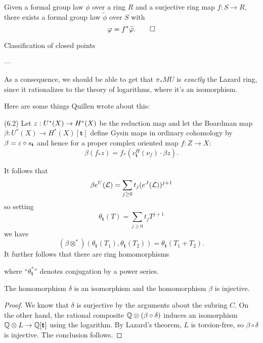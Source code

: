 \begin{corollary}
Given a formal group law $\phi$ over a ring $R$ and a surjective ring map $f: S \to R$, there exists a formal group law $\widetilde \phi$ over $S$ with \[\phi = f^* \widetilde \phi. \qed\]
\end{corollary}

Classification of closed points


---

As a consequence, we should be able to get that $\pi_* MU$ is \emph{exactly} the Lazard ring, since it rationalizes to the theory of logarithms, where it's an isomorphism.

Here are some things Quillen wrote about this:

\begin{definition}(6.2)
Let $\eps: U^*(X) \to H^*(X)$ be the reduction map and let the Boardman map $\beta: U^*(X) \to H^*(X)[\mathbf t]$ define Gysin maps in ordinary cohomology by $\beta = \eps \circ s_{\mathbf t}$ and hence for a proper complex oriented map $f: Z \to X$: \[\beta(f_* z) = f_*(c_{\mathbf t}^H(\nu_f) \cdot \beta z).\] 
\end{definition}

\begin{definition}
It follows that \[\beta e^U(\L) = \sum_{j \ge 0} t_j(e^J(\L))^{j+1}\] so setting \[\theta_{\mathbf t}(T) = \sum_{j \ge 0} t_j T^{j+1}\] we have \[(\beta \otimes^*)(\theta_{\mathbf t}(T_1), \theta_{\mathbf t}(T_2)) = \theta_{\mathbf t}(T_1 + T_2).\]  It further follows that there are ring homomorphisms
\begin{center}
\end{center}
where ``$\theta_{\mathbf t}^*$'' denotes conjugation by a power series.
\end{definition}

\begin{theorem}
The homomorphism $\delta$ is an isomorphism and the homomorphism $\beta$ is injective.
\end{theorem}
\begin{proof}
We know that $\delta$ is surjective by the arguments about the subring $C$.  On the other hand, the rational composite $\Q \otimes (\beta \circ \delta)$ induces an isomorphism $\Q \otimes L \to \Q[\mathbf t]$ using the logarithm.  By Lazard's theorem, $L$ is torsion-free, so $\beta \circ \delta$ is injective.  The conclusion follows.
\end{proof}







